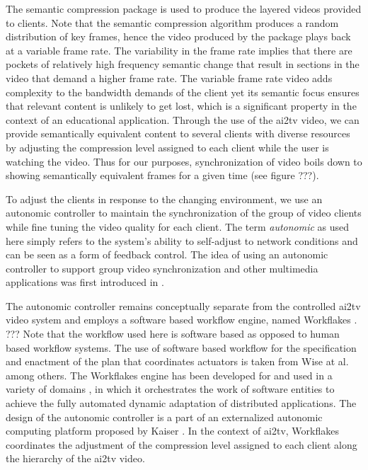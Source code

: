 \documentclass{sig-alternate}
\begin{document}
The semantic compression package is used to produce the layered videos
provided to clients.  Note that the semantic compression algorithm
produces a random distribution of key frames, hence the video produced
by the package plays back at a variable frame rate.  The variability
in the frame rate implies that there are pockets of relatively high
frequency semantic change that result in sections in the video that
demand a higher frame rate.  The variable frame rate video adds
complexity to the bandwidth demands of the client yet its semantic
focus ensures that relevant content is unlikely to get lost, which is
a significant property in the context of an educational application.
Through the use of the ai2tv video, we can provide semantically
equivalent content to several clients with diverse resources by
adjusting the compression level assigned to each client while the user
is watching the video.  Thus for our purposes, synchronization of
video boils down to showing semantically equivalent frames for a given
time (see figure ???).

To adjust the clients in response to the changing environment, we use
an autonomic controller to maintain the synchronization of the group
of video clients while fine tuning the video quality for each client.
The term \textit{autonomic} as used here simply refers to the system's
ability to self-adjust to network conditions and can be seen as a form
of feedback control.  The idea of using an autonomic controller to
support group video synchronization and other multimedia applications
was first introduced in \cite{EWSPT}.

The autonomic controller remains conceptually separate from the
controlled ai2tv video system and employs a software based workflow
engine, named Workflakes \cite{PEPPO}.  ??? Note that the workflow
used here is software based as opposed to human based workflow
systems.  The use of software based workflow for the specification and
enactment of the plan that coordinates actuators is taken from Wise at
al. \cite{OSTERWEIL} among others.  The Workflakes engine has been
developed for and used in a variety of domains \cite{AMS,ICSE}, in
which it orchestrates the work of software entities to achieve the
fully automated dynamic adaptation of distributed applications.  The
design of the autonomic controller is a part of an externalized
autonomic computing platform proposed by Kaiser \cite{refarch}.  In
the context of ai2tv, Workflakes coordinates the adjustment of the
compression level assigned to each client along the hierarchy of the
ai2tv video.
\end{document}
